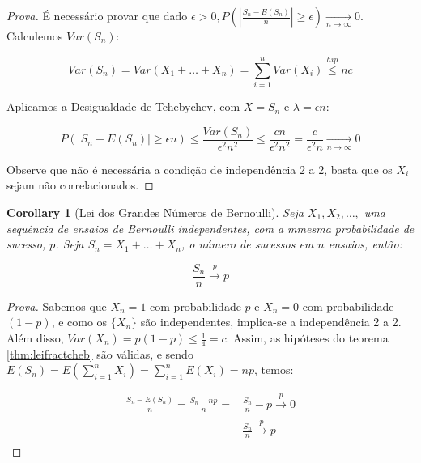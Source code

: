 \documentclass[
]{article}
\newtheorem{corollary}{Corollary}[section]
\theoremstyle{definition}
\theoremstyle{definition}
\theoremstyle{definition}
\theoremstyle{definition}
\theoremstyle{remark}
\begin{document}
\begin{proof}[Prova]
É necessário provar que dado \(\epsilon > 0, P\left(|\frac{S_{n} - E(S_{n})}{n}| \ge \epsilon\right) \xrightarrow[n \to \infty]{} 0\). Calculemos \(Var(S_{n})\):

\begin{equation*}
Var(S_{n}) = Var(X_{1} + \ldots + X_{n}) = \sum_{i=1}^{n}Var(X_{i}) \stackrel{hip}{\le} nc
\end{equation*}

Aplicamos a Desigualdade de Tchebychev, com \(X = S_{n}\) e \(\lambda = \epsilon n\):

\begin{equation*}
P(|S_{n} - E(S_{n})| \ge \epsilon n) \le \frac{Var(S_{n})}{\epsilon^{2}n^{2}} \le \frac{cn}{\epsilon^{2}n^{2}} = \frac{c}{\epsilon^{2}n} \xrightarrow[n \to \infty]{} 0
\end{equation*}

Observe que não é necessária a condição de independência 2 a 2, basta que os \(X_{i}\) sejam não correlacionados.
\end{proof}

\begin{corollary}[Lei dos Grandes Números de Bernoulli]
Seja \(X_{1},X_{2},\ldots,\) uma sequência de ensaios de Bernoulli independentes, com a mmesma probabilidade de sucesso, \(p\). Seja \(S_{n} = X_{1} + \ldots + X_{n}\), o número de sucessos em \(n\) ensaios, então:

\begin{equation*}
\frac{S_{n}}{n} \xrightarrow[]{p} p
\end{equation*}
\end{corollary}

\begin{proof}[Prova]
Sabemos que \(X_{n} = 1\) com probabilidade \(p\) e \(X_{n} = 0\) com probabilidade \((1-p)\), e como os \(\{X_{n}\}\) são independentes, implica-se a independência 2 a 2. Além disso, \(Var(X_{n}) = p(1-p) \le \frac{1}{4} = c\). Assim, as hipóteses do teorema \ref{thm:leifractcheb} são válidas, e sendo \(E(S_{n}) = E\left(\sum_{i=1}^{n}X_{i}\right) = \sum_{i=1}^{n}E(X_{i}) = np\), temos:

\begin{align*}
\frac{S_{n} - E(S_{n})}{n} = \frac{S_{n} - np}{n} = &\frac{S_{n}}{n} - p \xrightarrow[]{p} 0 \\
&\frac{S_{n}}{n} \xrightarrow[]{p} p
\end{align*}
\end{proof}
\end{document}
